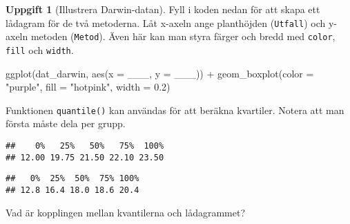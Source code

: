 \documentclass[
]{book}
\newenvironment{Shaded}{\begin{snugshade}}{\end{snugshade}}
\newcommand{\AttributeTok}[1]{\textcolor[rgb]{0.77,0.63,0.00}{#1}}
\newcommand{\FloatTok}[1]{\textcolor[rgb]{0.00,0.00,0.81}{#1}}
\newcommand{\FunctionTok}[1]{\textcolor[rgb]{0.00,0.00,0.00}{#1}}
\newcommand{\NormalTok}[1]{#1}
\newcommand{\OtherTok}[1]{\textcolor[rgb]{0.56,0.35,0.01}{#1}}
\newcommand{\SpecialCharTok}[1]{\textcolor[rgb]{0.00,0.00,0.00}{#1}}
\newcommand{\StringTok}[1]{\textcolor[rgb]{0.31,0.60,0.02}{#1}}
\theoremstyle{definition}
\theoremstyle{definition}
\theoremstyle{definition}
\newtheorem{exercise}{Uppgift}[chapter]
\theoremstyle{definition}
\theoremstyle{remark}
\begin{document}
\begin{exercise}[Illustrera Darwin-datan]
Fyll i koden nedan för att skapa ett lådagram för de två metoderna. Låt x-axeln ange planthöjden (\texttt{Utfall}) och y-axeln metoden (\texttt{Metod}). Även här kan man styra färger och bredd med \texttt{color}, \texttt{fill} och \texttt{width}.

\begin{Shaded}
\begin{Highlighting}[]
\FunctionTok{ggplot}\NormalTok{(dat\_darwin, }\FunctionTok{aes}\NormalTok{(}\AttributeTok{x =}\NormalTok{ \_\_\_, }\AttributeTok{y =}\NormalTok{ \_\_\_)) }\SpecialCharTok{+}
  \FunctionTok{geom\_boxplot}\NormalTok{(}\AttributeTok{color =} \StringTok{"purple"}\NormalTok{, }\AttributeTok{fill =} \StringTok{"hotpink"}\NormalTok{, }\AttributeTok{width =} \FloatTok{0.2}\NormalTok{)}
\end{Highlighting}
\end{Shaded}

Funktionen \texttt{quantile()} kan användas för att beräkna kvartiler. Notera att man första måste dela per grupp.

\begin{Shaded}
\end{Shaded}

\begin{verbatim}
##    0%   25%   50%   75%  100% 
## 12.00 19.75 21.50 22.10 23.50
\end{verbatim}

\begin{Shaded}
\end{Shaded}

\begin{verbatim}
##   0%  25%  50%  75% 100% 
## 12.8 16.4 18.0 18.6 20.4
\end{verbatim}

Vad är kopplingen mellan kvantilerna och lådagrammet?
\end{exercise}
\end{document}
